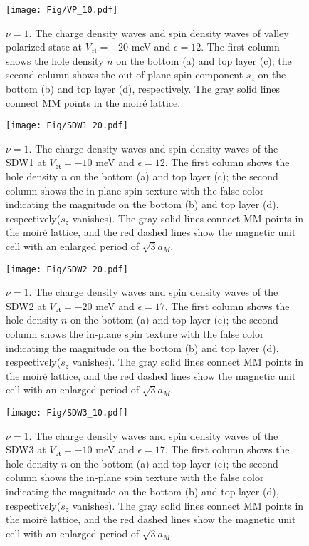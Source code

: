 \documentclass[aps,prl,onecolumn,superscriptaddress,longbibliography]{revtex4-2}
\begin{document}
\begin{figure}[ht]
    \centering
    \texttt{[image: Fig/VP\_10.pdf]}
    \caption{$\nu=1$. The charge density waves and spin density waves of valley polarized state at $V_{z\mathfrak{t}}=-20$ meV and $\epsilon=12$. The first column shows the hole density $n$ on the bottom (a) and top layer (c); the second column shows the out-of-plane spin component $s_z$ on the bottom (b) and top layer (d), respectively. The gray solid lines connect MM points in the moir\'e lattice.}
    \label{fig:VP_10}
\end{figure}


\begin{figure}[ht]
    \centering
    \texttt{[image: Fig/SDW1\_20.pdf]}
    \caption{$\nu=1$. The charge density waves and spin density waves of the SDW1 at $V_{z\mathfrak{t}}=-10$ meV and $\epsilon=12$. The first column shows the hole density $n$ on the bottom (a) and top layer (c); the second column shows the in-plane spin texture with the false color indicating the magnitude on the bottom (b) and top layer (d), respectively($s_z$ vanishes). The gray solid lines connect MM points in the moir\'e lattice, and the red dashed lines show the magnetic unit cell with an enlarged period of $\sqrt{3} a_M$.}
    \label{fig:SDW1_20}
\end{figure}

\begin{figure}[ht]
    \centering
    \texttt{[image: Fig/SDW2\_20.pdf]}
    \caption{$\nu=1$. The charge density waves and spin density waves of the SDW2 at $V_{z\mathfrak{t}}=-20$ meV and $\epsilon=17$. The first column shows the hole density $n$ on the bottom (a) and top layer (c); the second column shows the in-plane spin texture with the false color indicating the magnitude on the bottom (b) and top layer (d), respectively($s_z$ vanishes). The gray solid lines connect MM points in the moir\'e lattice, and the red dashed lines show the magnetic unit cell with an enlarged period of $\sqrt{3} a_M$.}
    \label{fig:SDW2_20}
\end{figure}


\begin{figure}[ht]
    \centering
    \texttt{[image: Fig/SDW3\_10.pdf]}
    \caption{$\nu=1$. The charge density waves and spin density waves of the SDW3 at $V_{z\mathfrak{t}}=-10$ meV and $\epsilon=17$. The first column shows the hole density $n$ on the bottom (a) and top layer (c); the second column shows the in-plane spin texture with the false color indicating the magnitude on the bottom (b) and top layer (d), respectively($s_z$ vanishes). The gray solid lines connect MM points in the moir\'e lattice, and the red dashed lines show the magnetic unit cell with an enlarged period of $\sqrt{3} a_M$.}
    \label{fig:SDW3_10}
\end{figure}
\end{document}

